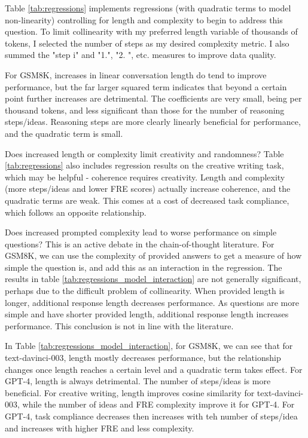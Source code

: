\documentclass[11pt]{article}
\begin{document}
Table \ref{tab:regressions} implements regressions (with quadratic terms to model non-linearity) controlling for length and complexity to begin to address this question. To limit collinearity with my preferred length variable of thousands of tokens, I selected the number of steps as my desired complexity metric. I also summed the "step i" and "1.", "2. ", etc. measures to improve data quality.

For GSM8K, increases in linear conversation length do tend to improve performance, but the far larger squared term indicates that beyond a certain point further increases are detrimental. The coefficients are very small, being per thousand tokens, and less significant than those for the number of reasoning steps/ideas. Reasoning steps are more clearly linearly beneficial for performance, and the quadratic term is small.

Does increased length or complexity limit creativity and randomness? Table \ref{tab:regressions} also includes regression results on the creative writing task, which may be helpful - coherence requires creativity. Length and complexity (more steps/ideas and lower FRE scores) actually increase coherence, and the quadratic terms are weak. This comes at a cost of decreased task compliance, which follows an opposite relationship.

Does increased prompted complexity lead to worse performance on simple questions? This is an active debate in the chain-of-thought literature. \cite{fu_complexity-based_2023, shum_automatic_2023} For GSM8K, we can use the complexity of provided answers to get a measure of how simple the question is, and add this as an interaction in the regression. The results in table \ref{tab:regressions_model_interaction} are not generally significant, perhaps due to the difficult problem of collinearity. When provided length is longer, additional response length decreases performance. As questions are more simple and have shorter provided length, additional response length increases performance. This conclusion is not in line with the literature.

In Table \ref{tab:regressions_model_interaction}, for GSM8K, we can see that for text-davinci-003, length mostly decreases performance, but the relationship changes once length reaches a certain level and a quadratic term takes effect. For GPT-4, length is always detrimental. The number of steps/ideas is more beneficial. For creative writing, length improves cosine similarity for text-davinci-003, while the number of ideas and FRE complexity improve it for GPT-4. For GPT-4, task compliance decreases then increases with teh number of steps/idea and increases with higher FRE and less complexity.
\end{document}
